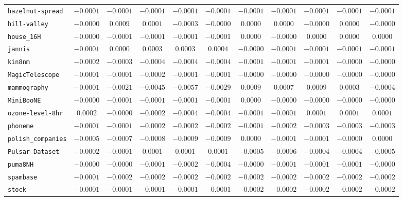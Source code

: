 {\begin{tabular}{@{}lcccccccccc@{}}
\texttt{hazelnut-spread} & $-0.0001$ & $-0.0001$ & $-0.0001$ & $-0.0001$ & $-0.0001$ & $-0.0001$ & $-0.0001$ & $-0.0001$ & $-0.0001$ & $-0.0001$ \\
\texttt{hill-valley} & $-0.0000$ & $0.0009$ & $0.0001$ & $-0.0003$ & $-0.0000$ & $0.0000$ & $0.0000$ & $-0.0000$ & $0.0000$ & $-0.0000$ \\
\texttt{house\_16H} & $-0.0000$ & $-0.0001$ & $-0.0001$ & $-0.0001$ & $-0.0001$ & $0.0000$ & $-0.0000$ & $0.0000$ & $0.0000$ & $0.0000$ \\
\texttt{jannis} & $-0.0001$ & $0.0000$ & $0.0003$ & $0.0003$ & $0.0004$ & $-0.0000$ & $-0.0001$ & $-0.0001$ & $-0.0001$ & $-0.0001$ \\
\texttt{kin8nm} & $-0.0002$ & $-0.0003$ & $-0.0004$ & $-0.0004$ & $-0.0004$ & $-0.0001$ & $-0.0001$ & $-0.0001$ & $-0.0000$ & $-0.0000$ \\
\texttt{MagicTelescope} & $-0.0001$ & $-0.0001$ & $-0.0002$ & $-0.0001$ & $-0.0001$ & $-0.0000$ & $-0.0000$ & $-0.0000$ & $-0.0000$ & $-0.0000$ \\
\texttt{mammography} & $-0.0001$ & $-0.0021$ & $-0.0045$ & $-0.0057$ & $-0.0029$ & $0.0009$ & $0.0007$ & $0.0009$ & $0.0003$ & $-0.0004$ \\
\texttt{MiniBooNE} & $-0.0000$ & $-0.0001$ & $-0.0001$ & $-0.0001$ & $-0.0001$ & $0.0000$ & $-0.0000$ & $-0.0000$ & $-0.0000$ & $-0.0000$ \\
\texttt{ozone-level-8hr} & $0.0002$ & $-0.0000$ & $-0.0002$ & $-0.0004$ & $-0.0004$ & $-0.0001$ & $-0.0001$ & $0.0001$ & $0.0001$ & $0.0001$ \\
\texttt{phoneme} & $-0.0001$ & $-0.0001$ & $-0.0002$ & $-0.0002$ & $-0.0002$ & $-0.0001$ & $-0.0002$ & $-0.0003$ & $-0.0003$ & $-0.0003$ \\
\texttt{polish\_companies} & $-0.0005$ & $-0.0007$ & $-0.0008$ & $-0.0009$ & $-0.0009$ & $0.0000$ & $-0.0001$ & $-0.0001$ & $-0.0000$ & $0.0000$ \\
\texttt{Pulsar-Dataset} & $-0.0002$ & $-0.0001$ & $0.0001$ & $0.0001$ & $0.0001$ & $-0.0005$ & $-0.0006$ & $-0.0004$ & $-0.0004$ & $-0.0005$ \\
\texttt{puma8NH} & $-0.0000$ & $-0.0000$ & $-0.0001$ & $-0.0002$ & $-0.0004$ & $-0.0000$ & $-0.0001$ & $-0.0001$ & $-0.0001$ & $-0.0000$ \\
\texttt{spambase} & $-0.0001$ & $-0.0002$ & $-0.0002$ & $-0.0002$ & $-0.0002$ & $-0.0002$ & $-0.0002$ & $-0.0002$ & $-0.0002$ & $-0.0002$ \\
\texttt{stock} & $-0.0001$ & $-0.0001$ & $-0.0001$ & $-0.0001$ & $-0.0001$ & $-0.0002$ & $-0.0002$ & $-0.0002$ & $-0.0002$ & $-0.0002$ \\

\end{tabular}}
